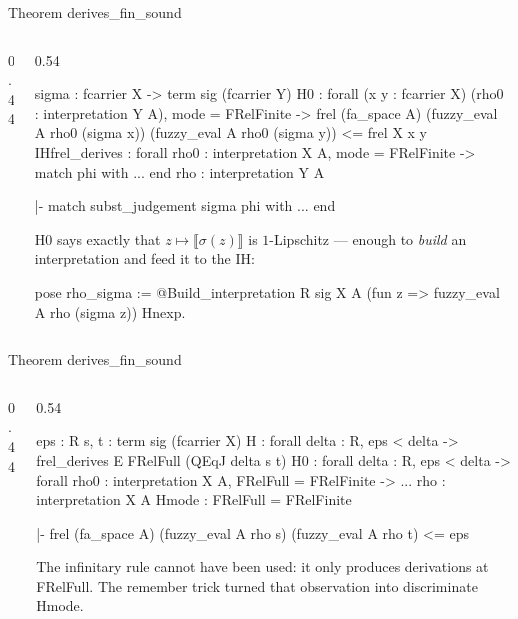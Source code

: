\documentclass[10pt,aspectratio=169]{beamer}
\newcommand{\den}[1]{\llbracket #1 \rrbracket}
\newcommand{\rid}[1]{{\ttfamily\small #1}}
\begin{document}
\begin{frame}[fragile]{Theorem \rid{derives\_fin\_sound}}
  \begin{columns}[T]
  \begin{column}{0.44\textwidth}\end{column}
  \begin{column}{0.54\textwidth}
    \begin{goalbox}[title={Goal 7 / 12 \quad (FD\_Subst)}]
\begin{gctx}
sigma : fcarrier X -> term sig (fcarrier Y)
H0 : forall (x y : fcarrier X) (rho0 : interpretation Y A),
     mode = FRelFinite ->
     frel (fa_space A) (fuzzy_eval A rho0 (sigma x))
                       (fuzzy_eval A rho0 (sigma y))
     <= frel X x y
IHfrel_derives : forall rho0 : interpretation X A,
     mode = FRelFinite -> match phi with ... end
rho : interpretation Y A
\end{gctx}
\tcblower
\begin{gconc}
|- match subst_judgement sigma phi with ... end
\end{gconc}
    \end{goalbox}
    {\footnotesize \rid{H0} says exactly that
    $z \mapsto \den{\sigma(z)}$ is $1$-Lipschitz --- enough to
    \emph{build} an interpretation and feed it to the IH:}
    \begin{srcbox}
  pose rho_sigma := @Build_interpretation R sig X A
    (fun z => fuzzy_eval A rho (sigma z)) Hnexp.
    \end{srcbox}
  \end{column}
  \end{columns}
\end{frame}

\begin{frame}[fragile]{Theorem \rid{derives\_fin\_sound}}
  \begin{columns}[T]
  \begin{column}{0.44\textwidth}\end{column}
  \begin{column}{0.54\textwidth}
    \begin{goalbox}[title={Goal 12 / 12 \quad (FD\_OrderComplete)}]
\begin{gctx}
eps : R
s, t : term sig (fcarrier X)
H  : forall delta : R, eps < delta ->
     frel_derives E FRelFull (QEqJ delta s t)
H0 : forall delta : R, eps < delta ->
     forall rho0 : interpretation X A,
     FRelFull = FRelFinite -> ...
rho : interpretation X A
Hmode : FRelFull = FRelFinite
\end{gctx}
\tcblower
\begin{gconc}
|- frel (fa_space A) (fuzzy_eval A rho s)
                     (fuzzy_eval A rho t) <= eps
\end{gconc}
    \end{goalbox}
    \smallskip
    {\footnotesize The infinitary rule \alert{cannot have been used}: it
    only produces derivations at \rid{FRelFull}. The \rid{remember}
    trick turned that observation into \rid{discriminate Hmode}.}
  \end{column}
  \end{columns}
\end{frame}
\end{document}
